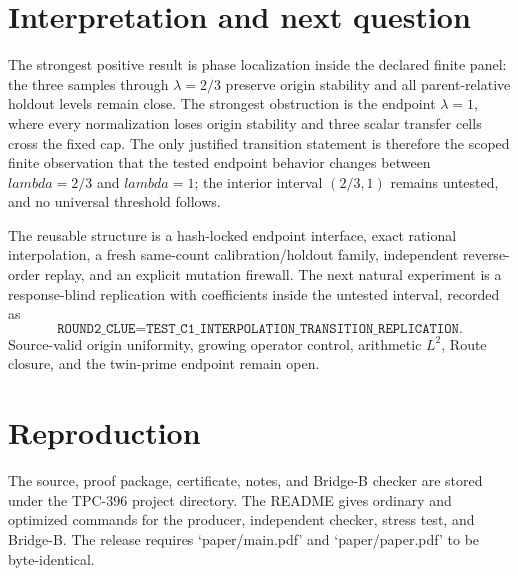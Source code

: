 \documentclass[10pt]{article}
\begin{document}
\section{Interpretation and next question}

The strongest positive result is phase localization inside the declared finite
panel: the three samples through $\lambda=2/3$ preserve origin stability and
all parent-relative holdout levels remain close.  The strongest obstruction is
the endpoint $\lambda=1$, where every normalization loses origin stability and
three scalar transfer cells cross the fixed cap.  The only justified transition
statement is therefore the scoped finite observation that the tested endpoint
behavior changes between $lambda=2/3$ and $lambda=1$; the interior interval
$(2/3,1)$ remains untested, and no universal threshold follows.

The reusable structure is a hash-locked endpoint interface, exact rational
interpolation, a fresh same-count calibration/holdout family, independent
reverse-order replay, and an explicit mutation firewall.  The next natural
experiment is a response-blind replication with coefficients inside the
untested interval, recorded as
\[
 \texttt{ROUND2\_CLUE=TEST\_C1\_INTERPOLATION\_TRANSITION\_REPLICATION}.
\]
Source-valid origin uniformity, growing operator control, arithmetic $L^2$,
Route closure, and the twin-prime endpoint remain open.

\section*{Reproduction}

The source, proof package, certificate, notes, and Bridge-B checker are stored
under the TPC-396 project directory.  The README gives ordinary and optimized
commands for the producer, independent checker, stress test, and Bridge-B.
The release requires `paper/main.pdf' and `paper/paper.pdf' to be byte-identical.
\end{document}

